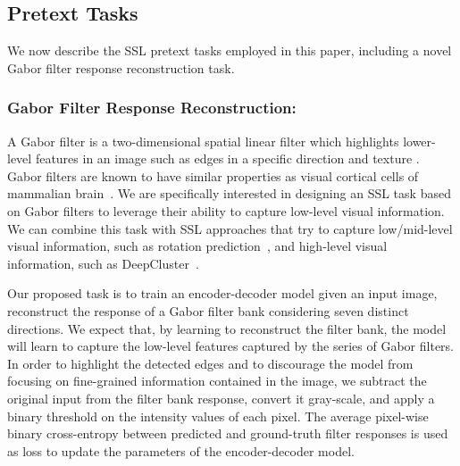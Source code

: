 \documentclass[runningheads]{llncs}
\begin{document}
\subsection{Pretext Tasks}
We now describe the SSL pretext tasks employed in this paper, including a novel Gabor filter response reconstruction task. 




\vspace{-5pt}\subsubsection{Gabor Filter Response Reconstruction:}
A Gabor filter is a two-dimensional spatial linear filter which highlights lower-level features in an image such as edges in a specific direction and texture \cite{fogel1989gabor}. 
Gabor filters are known to have similar properties as visual cortical cells of mammalian brain~\cite{daugman1980two,daugman1985uncertainty}. We are specifically interested in designing an SSL task based on Gabor filters to leverage their ability to capture low-level visual information. We can combine this task with SSL approaches that try to capture low/mid-level visual information, such as rotation prediction~\cite{gidaris2018unsupervised}, and high-level visual information, such as DeepCluster~\cite{caron2018deep}. 

Our proposed task is to train an encoder-decoder model given an input image, reconstruct the response of a Gabor filter bank considering seven distinct directions. We expect that, by learning to reconstruct the filter bank, the model will learn to capture the low-level features captured by the series of Gabor filters. In order to highlight the detected edges and to discourage the model from focusing on fine-grained information contained in the image, we subtract the original input from the filter bank response, convert it gray-scale, and apply a binary threshold on the intensity values of each pixel. The average pixel-wise binary cross-entropy between predicted and ground-truth filter responses is used as loss to update the parameters of the encoder-decoder model. 
\end{document}
